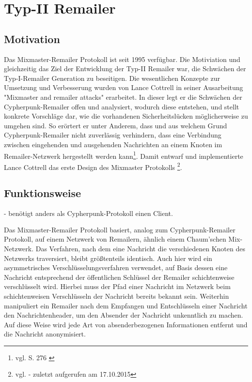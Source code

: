 \chapter{Typ-II Remailer}
\section{Motivation}
Das Mixmaster-Remailer Protokoll ist seit 1995 verfügbar. Die Motiviation und gleichzeitig das Ziel der Entwicklung der Typ-II Remailer war, die Schwächen der Typ-I-Remailer Generation zu beseitigen. Die wesentlichen Konzepte zur Umsetzung und Verbesserung wurden von Lance Cottrell in seiner Ausarbeitung "{}Mixmaster and remailer attacks"{} erarbeitet. In dieser legt er die Schwächen der Cypherpunk-Remailer offen und analysiert, wodurch diese entstehen, und stellt konkrete Vorschläge dar, wie die vorhandenen Sicherheitslücken möglicherweise zu umgehen sind. So erörtert er unter Anderem, dass und aus welchem Grund Cypherpunk-Remailer nicht zuverlässig verhindern, dass eine Verbindung zwischen eingehenden und ausgehenden Nachrichten an einem Knoten im Remailer-Netzwerk hergestellt werden kann\footnote{vgl. S. 276 \cite{oram2001peer}}. Damit entwarf und implementierte Lance Cottrell das erste Design des Mixmaster Protokolls \footnote{vgl. \cite{mixmastermanpage} - zuletzt aufgerufen am 17.10.2015}.

\section{Funktionsweise}
- benötigt anders als Cypherpunk-Protokoll einen Client.

Das Mixmaster-Remailer Protokoll basiert, analog zum Cypherpunk-Remailer Protokoll, auf einem Netzwerk von Remailern, ähnlich einem Chaum'schen Mix-Netzwerk. Das Verfahren, nach dem eine Nachricht die verschiedenen Knoten des Netzwerks traversiert, bleibt größtenteils identisch. Auch hier wird ein asymmetrisches Verschlüsselungsverfahren verwendet, auf Basis dessen eine Nachricht entsprechend der öffentlichen Schlüssel der Remailer schichtenweise verschlüsselt wird. Hierbei muss der Pfad einer Nachricht im Netzwerk beim schichtenweisen Verschlüsseln der Nachricht bereits bekannt sein. Weiterhin manipuliert ein Remailer nach dem Empfangen und Entschlüsseln einer Nachricht den Nachrichtenheader, um den Absender der Nachricht unkenntlich zu machen. Auf diese Weise wird jede Art von absenderbezogenen Informationen entfernt und die Nachricht anonymisiert. 

